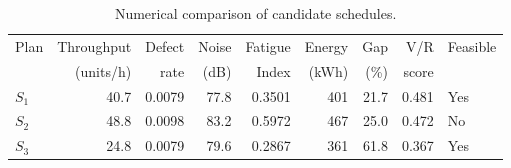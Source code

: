 \begin{table}[htbp]
\centering
\caption{Numerical comparison of candidate schedules.}
\label{tab:numerical-sim}
\small
\begin{tabular}{@{}lrrrrrrrl@{}}
\toprule
Plan & Throughput & Defect & Noise & Fatigue & Energy & Gap & V/R & Feasible \\
     & (units/h)  & rate   & (dB)  & Index   & (kWh)  & (\%) & score &         \\
\midrule
$S_{1}$ & 40.7 & 0.0079 & 77.8 & 0.3501 & 401 & 21.7 & 0.481 & Yes \\
$S_{2}$ & 48.8 & 0.0098 & 83.2 & 0.5972 & 467 & 25.0 & 0.472 & No \\
$S_{3}$ & 24.8 & 0.0079 & 79.6 & 0.2867 & 361 & 61.8 & 0.367 & Yes \\
\bottomrule
\end{tabular}
\end{table}
